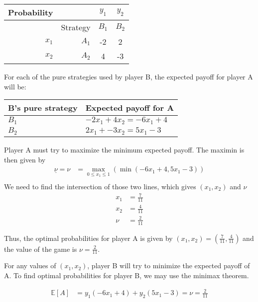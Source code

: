 \documentclass[12pt]{article}
\begin{document}
\begin{center}
  \begin{tabular}{|r|r|cc|}
    \hline
    Probability &          & $y_1$ & $y_2$ \\
    \hline
                & Strategy & $B_1$ & $B_2$ \\
    \hline
    $x_1$       & $A_1$    & -2    & 2     \\
    $x_2$       & $A_2$    & 4     & -3    \\
    \hline
  \end{tabular}
\end{center}

For each of the pure strategies used by player B, the expected payoff for player A will be:

\begin{center}
  \begin{tabular}{|l|l|}
    \hline
    \textbf{B's pure strategy} & \textbf{Expected payoff for A}              \\ 
    \hline
    $B_1$            & $-2 x_1 +4 x_2 = -6 x_1 + 4$ \\
    $B_2$            & $2 x_1 + -3 x_2 = 5 x_1 - 3$ \\
    \hline                    
  \end{tabular}
\end{center}
Player A must try to maximize the minimum expected payoff. The maximin is then given by
\begin{align*}
  \underline{\nu} = \nu &= \max_{0\le x_1\le 1}\left(\min\left(-6 x_1 + 4, 5 x_1-3\right)\right) \\
\end{align*}
We need to find the intersection of those two lines, which gives $\left(x_1,x_2\right)$ and $\nu$
\begin{align*}
  x_1 &= \frac{7}{11} \\
  x_2 &= \frac{4}{11} \\
  \nu &= \frac{2}{11}
\end{align*}

Thus, the optimal probabilities for player A is given by $\left(x_1,x_2\right) = \left(\frac{7}{11}, \frac{4}{11}\right)$
and the value of the game is $\nu = \frac{2}{11}$.

For any values of $\left(x_1,x_2\right)$, player B will try to minimize the expected payoff of A. 
To find optimal probabilities for player B, we may use the minimax theorem. 

\begin{align*}
  \mathbb{E}[A] &= y_1 \left(-6 x_1+4\right) + y_2 \left(5 x_1 - 3\right) = \nu = \frac{2}{11}
\end{align*}
\end{document}
